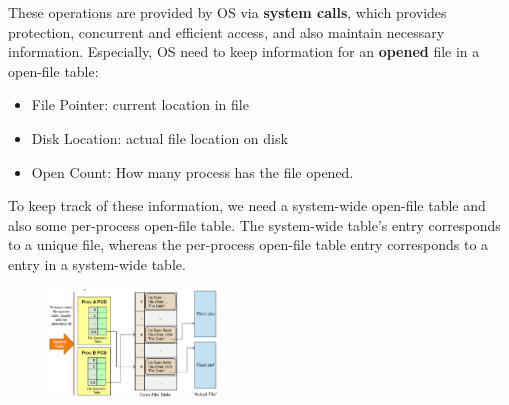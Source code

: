\documentclass[12pt]{article}
\theoremstyle{definition}
\begin{document}
These operations are provided by OS via \textbf{system calls}, which provides protection, concurrent and efficient access, and also maintain necessary information. Especially, OS need to keep information for an \textbf{opened} file in a open-file table:
\begin{itemize}
  \item File Pointer: current location in file
  \item Disk Location: actual file location on disk
  \item Open Count: How many process has the file opened.
\end{itemize}
To keep track of these information, we need a system-wide open-file table and also some per-process open-file table. The system-wide table's entry corresponds to a unique file, whereas the per-process open-file table entry corresponds to a entry in a system-wide table.
\begin{figure}[h]
\centering
\includegraphics[width=0.4\textwidth]{10_1.png}
\end{figure}
\end{document}

